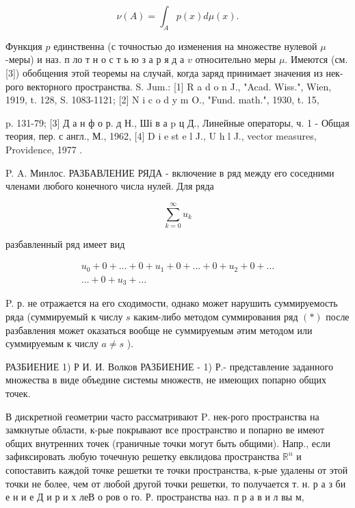 \documentclass[10pt]{article}
\begin{document}
\[

\nu(A)=\int_{A} p(x) d \mu(x) .

\]



Функция $p$ единственна (с точностью до изменения на множестве нулевой $\mu$-меры) и наз. п ло т н о с т ь ю з а р я д а $v$ относительно меры $\mu$. Имеются (см. [3]) обобщения этой теоремы на случай, когда заряд принимает значения из нек-рого векторного пространства. S. Jum.: [1] R a d o n J., "Acad. Wiss.", Wien, 1919, t. 128, S. 1083-1121; [2] N i c o d y m O., "Fund. math.", 1930, t. 15,

p. 131-79; [3] Д а н ф о р. д Н., Ші в а p ц Д., Линейные операторы, ч. 1 - Общая теория, пер. с англ., М., 1962, [4] D i e st e l J., U h l J., vector measures, Providence, 1977 .



P. A. Минлос. РАЗБАВЛЕНИЕ РЯДА - включение в ряд между его соседними членами любого конечного числа нулей. Для ряда



\[

\sum_{k=0}^{\infty} u_{k}

\]



разбавленный ряд имеет вид



\[

\begin{gathered}

u_{0}+0+\ldots+0+u_{1}+0+\ldots+0+u_{2}+0+\ldots \\

\ldots+0+u_{3}+\ldots

\end{gathered}

\]



P. р. не отражается на его сходимости, однако может нарушить суммируемость ряда (суммируемый к числу $s$ каким-либо методом суммирования ряд $(*)$ после разбавления может оказаться вообще не суммируемым әтим методом или суммируемым к числу $a \neq s$ ).



РАЗБИЕНИЕ 1) Р И. И. Волков РАЗБИЕНИЕ - 1) Р.- представление заданного множества в виде объедине системы множеств, не имеющих попарно общих точек.



В дискретной геометрии часто рассматривают $\mathrm{P}$. нек-рого пространства на замкнутые области, к-рые покрывают все пространство и попарно ве имеют общих внутренних точек (граничные точки могут быть общими). Напр., если зафиксировать любую точечную решетку евклидова пространства $\mathbb{R}^{n}$ и сопоставить каждой точке решетки те точки пространства, к-рые удалены от этой точки не более, чем от любой другой точки решетки, то получается т. н. р а з би е н и е Д и р и х леВ о ров о го. Р. пространства наз. п р а в и л вы м,
\end{document}

